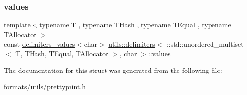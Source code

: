 \subsubsection{\texorpdfstring{values}{values}}
{\footnotesize\ttfamily template$<$typename T , typename T\+Hash , typename T\+Equal , typename T\+Allocator $>$ \\
const \mbox{\hyperlink{structutils_1_1delimiters__values}{delimiters\+\_\+values}}$<$char$>$ \mbox{\hyperlink{structutils_1_1delimiters}{utils\+::delimiters}}$<$ \+::std\+::unordered\+\_\+multiset$<$ T, T\+Hash, T\+Equal, T\+Allocator $>$, char $>$\+::values\hspace{0.3cm}{\ttfamily [static]}}



The documentation for this struct was generated from the following file\+:\begin{DoxyCompactItemize}
\item 
formats/utils/\mbox{\hyperlink{prettyprint_8h}{prettyprint.\+h}}\end{DoxyCompactItemize}
